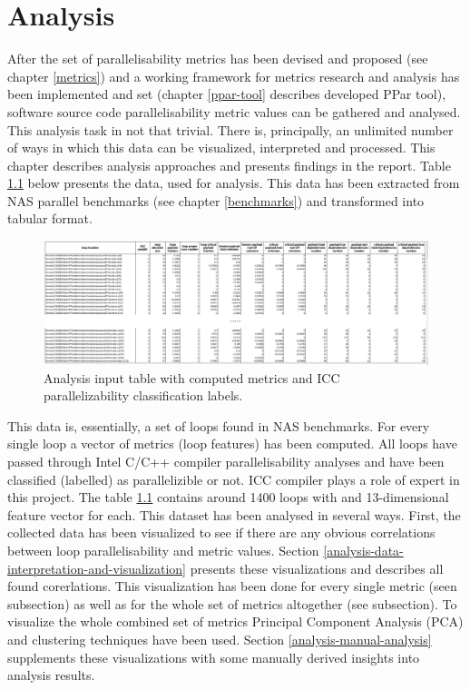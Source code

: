 \chapter{Analysis}

\null\qquad After the set of parallelisability metrics has been devised and proposed (see chapter \ref{metrics}) and a working framework for metrics research and analysis has been implemented and set (chapter \ref{ppar-tool} describes developed PPar tool), software source code parallelisability metric values can be gathered and analysed. This analysis task in not that trivial. There is, principally, an unlimited number of ways in which this data can be visualized, interpreted and processed. This chapter describes analysis approaches and presents findings in the report. \newline
\null\qquad Table \ref{analysis-data-table} below presents the data, used for analysis. This data has been extracted from NAS parallel benchmarks (see chapter \ref{benchmarks}) and transformed into tabular format.
\begin{figure}[htb]
	\centering
	\includegraphics[width=\linewidth]{figs/metrics-table.png}
	\caption{Analysis input table with computed metrics and ICC parallelizability classification labels.}
	\label{analysis-data-table}
\end{figure} \newline
\null\qquad This data is, essentially, a set of loops found in NAS benchmarks. For every single loop a vector of metrics (loop features) has been computed. All loops have passed through Intel C/C++ compiler parallelisability analyses and have been classified (labelled) as parallelizible or not. ICC compiler plays a role of expert in this project. The table \ref{analysis-data-table} contains around 1400 loops with and 13-dimensional feature vector for each. \newline 
\null\qquad This dataset has been analysed in several ways. First, the collected data has been visualized to see if there are any obvious correlations between loop parallelisability and metric values. Section \ref{analysis-data-interpretation-and-visualization} presents these visualizations and describes all found corerlations. This visualization has been done for every single metric (seen subsection) as well as for the whole set of metrics altogether (see subsection). To visualize the whole combined set of metrics Principal Component Analysis (PCA) and clustering techniques have been used. Section \ref{analysis-manual-analysis} supplements these visualizations with some manually derived insights into analysis results. \newline 

